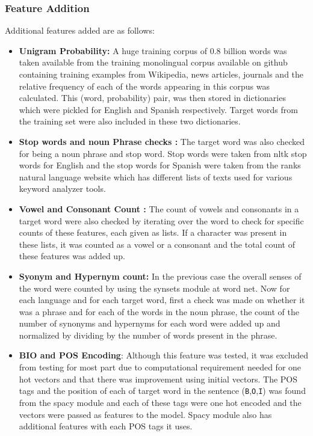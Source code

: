 \documentclass[10pt,a4paper]{article}
\begin{document}
\subsubsection{Feature Addition}
Additional features added are as follows:
\begin{itemize}
\item \textbf{Unigram Probability:}  A huge training corpus of 0.8 billion words was taken available from the training monolingual corpus available on github containing training examples from Wikipedia, news articles, journals and the relative frequency of each of the words appearing in this corpus was calculated. This (word, probability) pair, was then stored in dictionaries which were pickled for English and Spanish respectively.  Target words from the training set were also included in these two dictionaries.
\item \textbf{Stop words and noun Phrase checks :}
The target word was also checked for being a noun phrase and stop word. Stop words were taken from nltk stop words for English and the stop words for Spanish were taken from the ranks natural language website which has different lists of texts used for various keyword analyzer tools.
\item \textbf{Vowel and Consonant Count :}
The count of vowels and consonants in a target word were also checked by iterating over the word to check for specific counts of these features, each given as lists. If a character was present in these lists, it was counted as a vowel or a consonant and the total count of these features was added up.
\item \textbf{Syonym and Hypernym count:}
In the previous case the overall senses of the word were counted by using the synsets module at word net. Now for each language and for each target word, first a check was made on whether it was a phrase and for each of the words in the noun phrase, the count of the number of synonyms and hypernyms for each word were added up and normalized by dividing by the number of words present in the phrase.
\item \textbf{BIO and POS Encoding}:
Although this feature was tested, it was excluded from testing for most part due to computational requirement needed for one hot vectors and that there was improvement using initial vectors. The POS tags and the position of each of target word in the sentence (\texttt{B},\texttt{O},\texttt{I}) was found from the spacy module and each of these tags were one hot encoded and the vectors were passed as features to the model. Spacy module also has additional features with each POS tags it uses.
\end{itemize}
\end{document}
